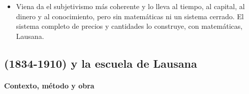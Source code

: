 \documentclass[11pt]{article}
\begin{document}
\begin{itemize}
\item Viena da el subjetivismo más coherente y lo lleva al tiempo, al capital, al dinero y al conocimiento, pero sin matemáticas ni un sistema cerrado. El sistema completo de precios y cantidades lo construye, con matemáticas, Lausana.
\end{itemize}

\subsection{ (1834-1910) y la escuela de Lausana}\label{sec:walras}

\paragraph{Contexto, método y obra}
\end{document}
